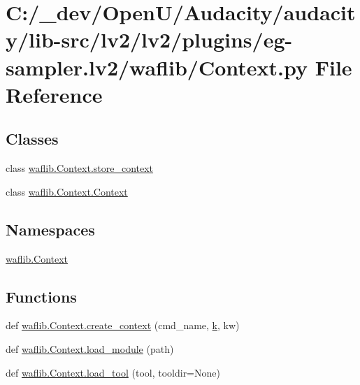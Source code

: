 \hypertarget{lv2_2plugins_2eg-sampler_8lv2_2waflib_2_context_8py}{}\section{C\+:/\+\_\+dev/\+Open\+U/\+Audacity/audacity/lib-\/src/lv2/lv2/plugins/eg-\/sampler.lv2/waflib/\+Context.py File Reference}
\label{lv2_2plugins_2eg-sampler_8lv2_2waflib_2_context_8py}
\subsection*{Classes}
\begin{DoxyCompactItemize}
\item 
class \hyperlink{classwaflib_1_1_context_1_1store__context}{waflib.\+Context.\+store\+\_\+context}
\item 
class \hyperlink{classwaflib_1_1_context_1_1_context}{waflib.\+Context.\+Context}
\end{DoxyCompactItemize}
\subsection*{Namespaces}
\begin{DoxyCompactItemize}
\item 
 \hyperlink{namespacewaflib_1_1_context}{waflib.\+Context}
\end{DoxyCompactItemize}
\subsection*{Functions}
\begin{DoxyCompactItemize}
\item 
def \hyperlink{namespacewaflib_1_1_context_a224d64e5e44f9aae4903dc52235d6470}{waflib.\+Context.\+create\+\_\+context} (cmd\+\_\+name, \hyperlink{rfft2d_test_m_l_8m_adc468c70fb574ebd07287b38d0d0676d}{k}, kw)
\item 
def \hyperlink{namespacewaflib_1_1_context_ae0923656ff2aebede696050061d6d48d}{waflib.\+Context.\+load\+\_\+module} (path)
\item 
def \hyperlink{namespacewaflib_1_1_context_a2f9fe1693a40a8fa972154b9eeec3424}{waflib.\+Context.\+load\+\_\+tool} (tool, tooldir=None)
\end{DoxyCompactItemize}
